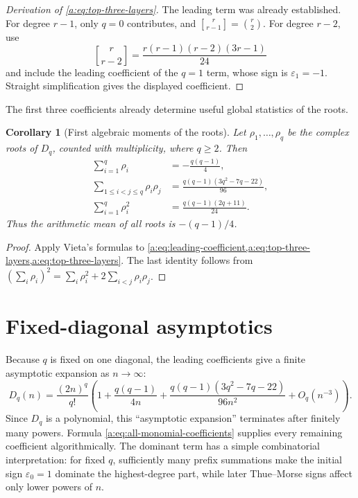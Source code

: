 \documentclass[11pt,a4paper,oneside,openany]{book}
\numberwithin{equation}{chapter}
\newtheorem{corollary}[theorem]{Corollary}
\theoremstyle{definition}
\theoremstyle{remark}
\newcommand{\eps}{\varepsilon}
\newcommand{\Diag}{D}
\newcommand{\stirlingfirst}[2]{\genfrac{[}{]}{0pt}{}{#1}{#2}}
\begin{document}
\begin{proof}[Derivation of \eqref{a:eq:top-three-layers}]
The leading term was already established.  For degree \(r-1\), only \(q=0\)
contributes, and
\(
\stirlingfirst{r}{r-1}=\binom r2
\).
For degree \(r-2\), use
\[
 \stirlingfirst{r}{r-2}
 =\frac{r(r-1)(r-2)(3r-1)}{24}
\]
and include the leading coefficient of the \(q=1\) term, whose sign is
\(\eps_1=-1\).  Straight simplification gives the displayed coefficient.
\end{proof}
The first three coefficients already determine useful global statistics of
the roots.

\begin{corollary}[First algebraic moments of the roots]
Let \(\rho_1,\ldots,\rho_q\) be the complex roots of \(\Diag_q\), counted
with multiplicity, where \(q\geq2\).  Then
\begin{align}
 \sum_{i=1}^{q}\rho_i
   &=-\frac{q(q-1)}4,                                      \label{c:eq:root-sum}\\
 \sum_{1\leq i<j\leq q}\rho_i\rho_j
   &=\frac{q(q-1)(3q^2-7q-22)}{96},                        \label{c:eq:root-e2}\\
 \sum_{i=1}^{q}\rho_i^2
   &=\frac{q(q-1)(2q+11)}{24}.                             \label{c:eq:root-square-sum}
\end{align}
Thus the arithmetic mean of all roots is \(-(q-1)/4\).
\end{corollary}

\begin{proof}
Apply Vieta's formulas to \cref{a:eq:leading-coefficient,a:eq:top-three-layers,a:eq:top-three-layers}.  The last
identity follows from
\((\sum_i\rho_i)^2=\sum_i\rho_i^2+2\sum_{i<j}\rho_i\rho_j\).
\end{proof}
\section{Fixed-diagonal asymptotics}

Because \(q\) is fixed on one diagonal, the leading coefficients give a
finite asymptotic expansion as \(n\to\infty\):
\begin{equation}
 \Diag_q(n)=\frac{(2n)^q}{q!}
 \left(
 1+\frac{q(q-1)}{4n}
 +\frac{q(q-1)(3q^2-7q-22)}{96n^2}
 +O_q(n^{-3})
 \right).                                                  \label{c:eq:diag-asymp}
\end{equation}
Since \(\Diag_q\) is a polynomial, this ``asymptotic expansion'' terminates
after finitely many powers.  Formula \cref{a:eq:all-monomial-coefficients} supplies every
remaining coefficient algorithmically.  The dominant term has a simple
combinatorial interpretation: for fixed \(q\), sufficiently many prefix
summations make the initial sign \(\eps_0=1\) dominate the highest-degree
part, while later Thue--Morse signs affect only lower powers of \(n\).
\end{document}
